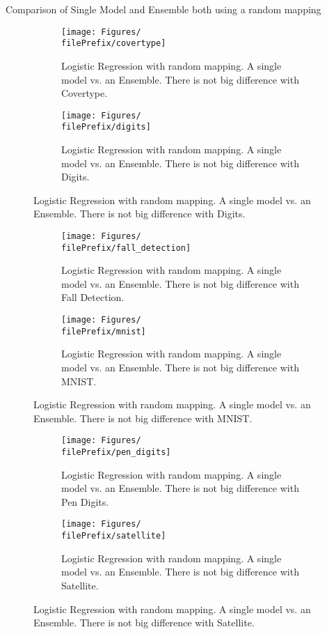 {\LARGE Comparison of Single Model and Ensemble both using a random mapping}

\renewcommand{\filePrefix}{\undPrefix/aux}
\begin{figure}[H]
  \centering
  \begin{subfigure}[t]{0.5\linewidth}
    \centering\captionsetup{width=.8\linewidth}\texttt{[image: Figures/\\filePrefix/covertype]}
    \caption{Logistic Regression with random mapping. A single model vs. an Ensemble. There is not big difference with Covertype.}
    \label{2_2:aux}
  \end{subfigure}%
  \begin{subfigure}[t]{0.5\linewidth}
    \centering\captionsetup{width=.8\linewidth}\texttt{[image: Figures/\\filePrefix/digits]}
    \caption{Logistic Regression with random mapping. A single model vs. an Ensemble. There is not big difference with Digits.}
    \label{fig:\undPrefix_digits}
  \end{subfigure}
\end{figure}


\begin{figure}[H]
  \centering
  \begin{subfigure}[t]{0.5\linewidth}
    \centering\captionsetup{width=.8\linewidth}\texttt{[image: Figures/\\filePrefix/fall\_detection]}
    \caption{Logistic Regression with random mapping. A single model vs. an Ensemble. There is not big difference with Fall Detection.}
    \label{fig:\undPrefix_fall_detection}
  \end{subfigure}%
  \begin{subfigure}[t]{0.5\linewidth}
    \centering\captionsetup{width=.8\linewidth}\texttt{[image: Figures/\\filePrefix/mnist]}
    \caption{Logistic Regression with random mapping. A single model vs. an Ensemble. There is not big difference with MNIST.}
    \label{fig:\undPrefix_mnist}
  \end{subfigure}
\end{figure}


\begin{figure}[H]
  \centering
  \begin{subfigure}[t]{0.5\linewidth}
    \centering\captionsetup{width=.8\linewidth}\texttt{[image: Figures/\\filePrefix/pen\_digits]}
    \caption{Logistic Regression with random mapping. A single model vs. an Ensemble. There is not big difference with Pen Digits.}
    \label{fig:\undPrefix_pen_digits}
  \end{subfigure}%
  \begin{subfigure}[t]{0.5\linewidth}
    \centering\captionsetup{width=.8\linewidth}\texttt{[image: Figures/\\filePrefix/satellite]}
    \caption{Logistic Regression with random mapping. A single model vs. an Ensemble. There is not big difference with Satellite.}
    \label{fig:\undPrefix_satellite}
  \end{subfigure}
\end{figure}

